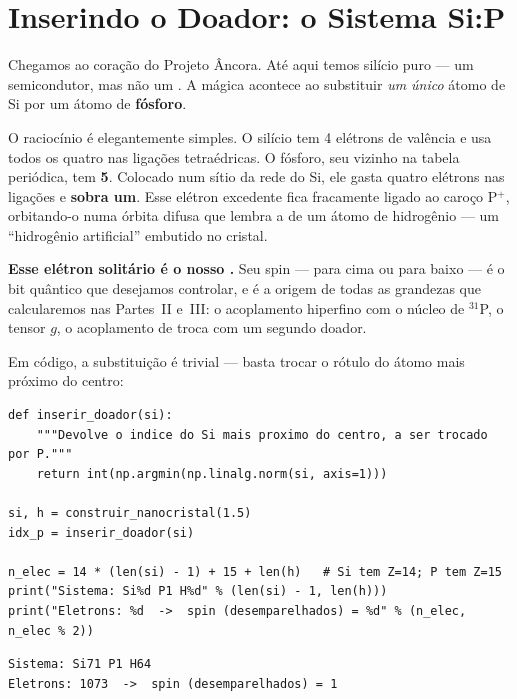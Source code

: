 \section{Inserindo o Doador: o Sistema Si:P}
\label{sec:doador}

Chegamos ao coração do Projeto Âncora. Até aqui temos silício puro --- um
semicondutor, mas não um \qubit{}. A mágica acontece ao substituir \emph{um único}
átomo de Si por um átomo de \textbf{fósforo}.

O raciocínio é elegantemente simples. O silício tem 4 elétrons de valência e usa
todos os quatro nas ligações tetraédricas. O fósforo, seu vizinho na tabela
periódica, tem \textbf{5}. Colocado num sítio da rede do Si, ele gasta quatro
elétrons nas ligações e \textbf{sobra um}. Esse elétron excedente fica fracamente
ligado ao caroço P$^+$, orbitando-o numa órbita difusa que lembra a de um átomo de
hidrogênio --- um ``hidrogênio artificial'' embutido no cristal.

\textbf{Esse elétron solitário é o nosso \qubit{}.} Seu spin --- para cima ou para
baixo --- é o bit quântico que desejamos controlar, e é a origem de todas as
grandezas que calcularemos nas Partes~II e~III: o acoplamento hiperfino com o
núcleo de $^{31}$P, o tensor $g$, o acoplamento de troca com um segundo doador.

Em código, a substituição é trivial --- basta trocar o rótulo do átomo mais
próximo do centro:

\begin{lstlisting}[style=python,caption={Inserindo o doador de fósforo.},label={lst:doador}]
def inserir_doador(si):
    """Devolve o indice do Si mais proximo do centro, a ser trocado por P."""
    return int(np.argmin(np.linalg.norm(si, axis=1)))

si, h = construir_nanocristal(1.5)
idx_p = inserir_doador(si)

n_elec = 14 * (len(si) - 1) + 15 + len(h)   # Si tem Z=14; P tem Z=15
print("Sistema: Si%d P1 H%d" % (len(si) - 1, len(h)))
print("Eletrons: %d  ->  spin (desemparelhados) = %d" % (n_elec, n_elec % 2))
\end{lstlisting}

\begin{lstlisting}[style=console]
Sistema: Si71 P1 H64
Eletrons: 1073  ->  spin (desemparelhados) = 1
\end{lstlisting}

